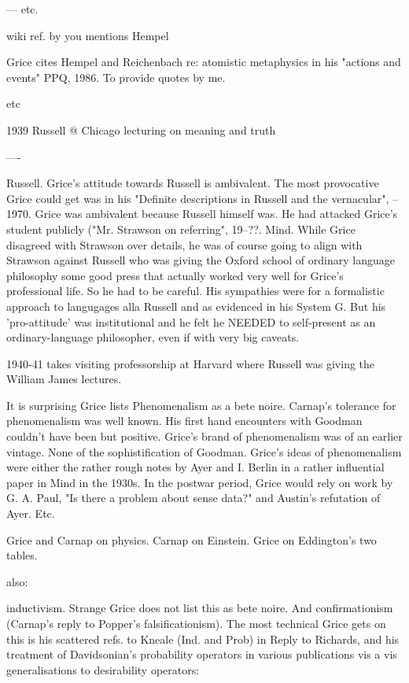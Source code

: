 \documentclass[10pt,titlepage]{book}
\begin{document}
--- etc. 

wiki ref. by you mentions Hempel
 
Grice cites Hempel and Reichenbach re: atomistic metaphysics in his  
"actions and events" PPQ, 1986. To provide quotes by me.
 
etc

1939 Russell @ Chicago lecturing on meaning and  truth  

----
 
Russell. Grice's attitude towards Russell is ambivalent. The most  
provocative Grice could get was in his "Definite descriptions in Russell and the  
vernacular", -- 1970. Grice was ambivalent because Russell himself was. He had 
 attacked Grice's student publicly ("Mr. Strawson on referring", 19--??. 
Mind.  While Grice disagreed with Strawson over details, he was of course 
going to  align with Strawson against Russell who was giving the Oxford school 
of ordinary  language philosophy some good press that actually worked very 
well for Grice's  professional life. So he had to be careful. His sympathies 
were for a  formalistic approach to langugages alla Russell and as evidenced 
in his System  G. But his 'pro-attitude' was institutional and he felt he 
NEEDED to  self-present as an ordinary-language philosopher, even if with very 
big  caveats.
 
1940-41 takes visiting professorship at Harvard  where Russell was giving 
the William James lectures.  

It is surprising Grice lists Phenomenalism as a bete noire. Carnap's  
tolerance for phenomenalism was well known. His first hand encounters with  
Goodman couldn't have been but positive. Grice's brand of phenomenalism was of  
an earlier vintage. None of the sophistification of Goodman. Grice's ideas of 
 phenomenalism were either the rather rough notes by Ayer and I. Berlin in 
a  rather influential paper in Mind in the 1930s. In the postwar period, 
Grice  would rely on work by G. A. Paul, "Is there a problem about sense data?" 
and  Austin's refutation of Ayer. Etc.

Grice and Carnap on physics. Carnap on Einstein. Grice on Eddington's two  
tables.
 
also:
 
inductivism. Strange Grice does not list this as bete noire. And  
confirmationism (Carnap's reply to Popper's falsificationism). The most  technical 
Grice gets on this is his scattered refs. to Kneale (Ind. and Prob) in  Reply 
to Richards, and his treatment of Davidsonian's probability operators in  
various publications vis a vis generalisations to desirability operators: 
 
\end{document}
